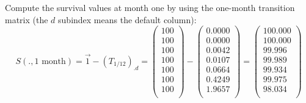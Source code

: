 \documentclass[a4paper,12pt,final]{article}
\begin{document}
Compute the survival values at month one by using the one-month transition matrix 
(the $d$ subindex means the default column):
\begin{displaymath}
S(.,1 \textrm{ month}) = \vec{1} - (T_{1/12})_{.d} = 
\left( 
\begin{array}{c}
 100 \\
 100 \\
 100 \\
 100 \\
 100 \\
 100 \\
 100 \\
\end{array}
\right)
 - 
\left( 
\begin{array}{c}
 0.0000 \\
 0.0000 \\
 0.0042 \\
 0.0107 \\
 0.0664 \\
 0.4249 \\
 1.9657 \\
\end{array}
\right)
=
\left( 
\begin{array}{c}
 100.000 \\
 100.000 \\
  99.996 \\
  99.989 \\
  99.934 \\
  99.975 \\
  98.034 \\
\end{array}
\right)
\end{displaymath}
\end{document}
